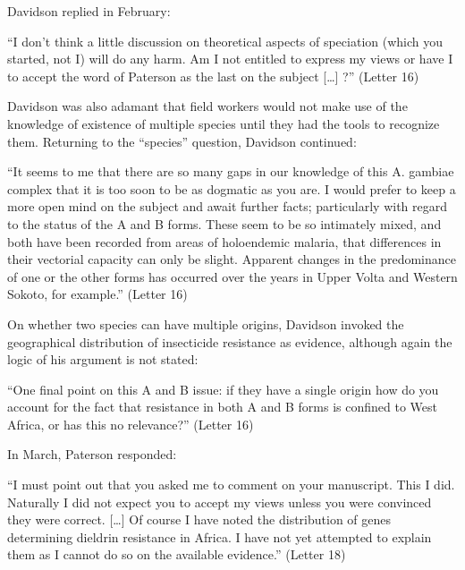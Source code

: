 \begin{refsection}
Davidson replied in February:


\begin{displayquote}
``I don't think a little discussion on theoretical aspects of speciation (which you started, not I) will do any harm. Am I not entitled to express my views or have I to accept the word of Paterson as the last on the subject [\ldots] ?'' (Letter 16)
\end{displayquote}


Davidson was also adamant that field workers would not make use of the knowledge of existence of multiple species until they had the tools to recognize them.
%
Returning to the ``species'' question, Davidson continued:


\begin{displayquote}
``It seems to me that there are so many gaps in our knowledge of this A. gambiae complex that it is too soon to be as dogmatic as you are. I would prefer to keep a more open mind on the subject and await further facts; particularly with regard to the status of the A and B forms. These seem to be so intimately mixed, and both have been recorded from areas of holoendemic malaria, that differences in their vectorial capacity can only be slight. Apparent changes in the predominance of one or the other forms has occurred over the years in Upper Volta and Western Sokoto, for example.'' (Letter 16)
\end{displayquote}


On whether two species can have multiple origins, Davidson invoked the geographical distribution of insecticide resistance as evidence, although again the logic of his argument is not stated:


\begin{displayquote}
``One final point on this A and B issue: if they have a single origin how do you account for the fact that resistance in both A and B forms is confined to West Africa, or has this no relevance?'' (Letter 16)
\end{displayquote}


In March, Paterson responded:


\begin{displayquote}
``I must point out that you asked me to comment on your manuscript. This I did. Naturally I did not expect you to accept my views unless you were convinced they were correct. [\ldots] Of course I have noted the distribution of genes determining dieldrin resistance in Africa. I have not yet attempted to explain them as I cannot do so on the available evidence.'' (Letter 18)
\end{displayquote}



\end{refsection}

